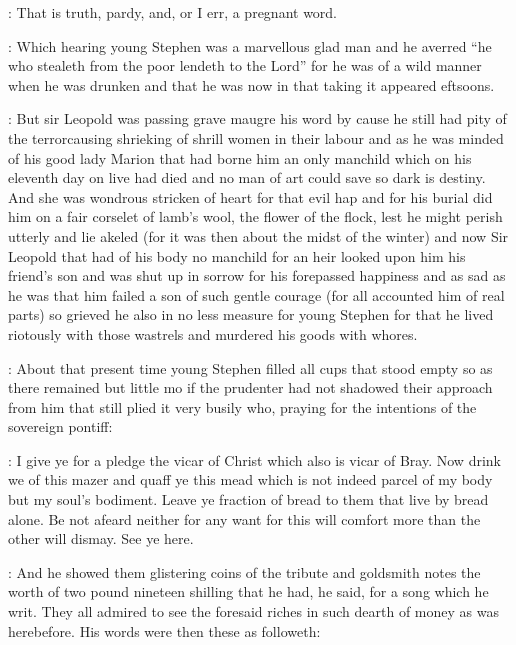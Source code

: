 \documentclass[12pt]{article}
\begin{document}
\Dx: That is truth, pardy, and, or I err, a pregnant word.

: Which hearing young Stephen was a marvellous glad man and he averred
“he who stealeth from the poor lendeth to the Lord” for he was of a wild
manner when he was drunken and that he was now in that taking it appeared
eftsoons.


: But sir Leopold was passing grave maugre his word by cause he still
had pity of the terrorcausing shrieking of shrill women in their labour
and as he was minded of his good lady Marion that had borne him an only
manchild which on his eleventh day on live had died and no man of art
could save so dark is destiny. And she was wondrous stricken of heart for
that evil hap and for his burial did him on a fair corselet of lamb's
wool, the flower of the flock, lest he might perish utterly and lie
akeled (for it was then about the midst of the winter) and now Sir
Leopold that had of his body no manchild for an heir looked upon him his
friend's son and was shut up in sorrow for his forepassed happiness and
as sad as he was that him failed a son of such gentle courage (for all
accounted him of real parts) so grieved he also in no less measure for
young Stephen for that he lived riotously with those wastrels and
murdered his goods with whores.



: About that present time young Stephen filled all cups that stood
empty so as there remained but little mo if the prudenter had not shadowed
their approach from him that still plied it very busily who, praying for
the intentions of the sovereign pontiff:

\SD: I give ye for a pledge the vicar of Christ which also is vicar of
Bray. Now drink we of this mazer and quaff ye this mead which is not
indeed parcel of my body but my soul's bodiment. Leave ye fraction of
bread to them that live by bread alone. Be not afeard neither for any want
for this will comfort more than the other will dismay. See ye here.

: And he showed them glistering coins of the tribute and goldsmith
notes the worth of two pound nineteen shilling that he had, he said, for a
song which he writ. They all admired to see the foresaid riches in such
dearth of money as was herebefore. His words were then these as followeth:
\end{document}
